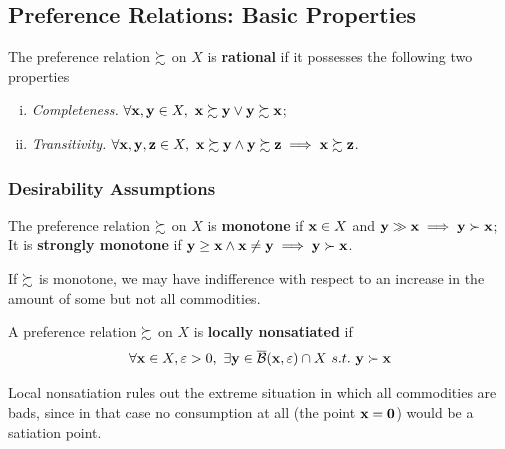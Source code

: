 \documentclass{report}
\begin{document}
 		\subsection{Preference Relations: Basic Properties}
 			\begin{definition}[3.B.1]
 				The preference relation $\succsim$ on $X$ is \textbf{rational} if it possesses the following two properties
 				\begin{enumerate}[(i)]
 					\item \emph{Completeness.} $\forall \textbf{x}, \textbf{y} \in X,\ \textbf{x} \succsim \textbf{y} \lor \textbf{y} \succsim \textbf{x}$;
 					\item \emph{Transitivity.} $\forall \textbf{x}, \textbf{y}, \textbf{z} \in X,\ \textbf{x} \succsim \textbf{y} \land \textbf{y} \succsim \textbf{z} \implies \textbf{x} \succsim \textbf{z}$.
 				\end{enumerate}
 			\end{definition}
 			
 			\subsubsection{Desirability Assumptions}
 			
 			\begin{definition}[3.B.2]
 				The preference relation $\succsim$ on $X$ is \textbf{monotone} if $\textbf{x} \in X$ and $\textbf{y} \gg \textbf{x} \implies \textbf{y} \succ \textbf{x}$; It is \textbf{strongly monotone} if $\textbf{y} \geq \textbf{x} \land \textbf{x} \neq \textbf{y} \implies \textbf{y} \succ \textbf{x}$.
 			\end{definition}
 			
 			\begin{remark}
 				If $\succsim$ is monotone, we may have indifference with respect to an increase in the amount of some but not all commodities.
 			\end{remark}
 			
 			\begin{definition}[3.B.3]
 				A preference relation $\succsim$ on $X$ is \textbf{locally nonsatiated} if
 				\begin{equation}
 					\forall \textbf{x} \in X, \varepsilon > 0,\ \exists \textbf{y} \in \overline{\mathcal{{B}}}(\textbf{x}, \varepsilon) \cap X\ s.t.\ \textbf{y} \succ \textbf{x}
 				\end{equation}
 			\end{definition}
 			
 			\begin{remark}
 				Local nonsatiation rules out the extreme situation in which all commodities are bads, since in that case no consumption at all (the point $\textbf{x} = \textbf{0}$) would be a satiation point.
 			\end{remark}
 			
\end{document}
